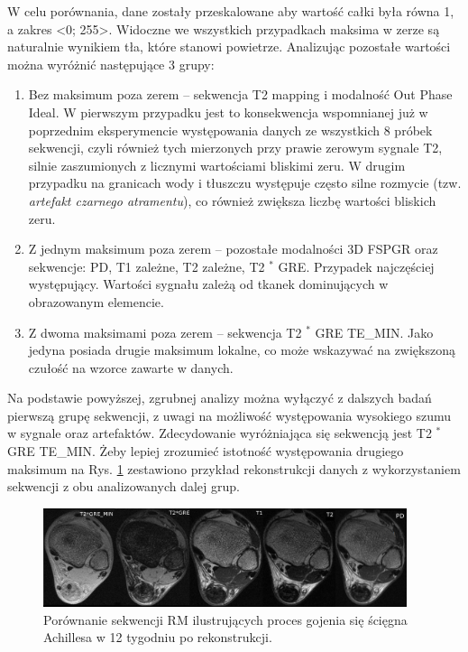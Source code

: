 W celu porównania, dane zostały przeskalowane aby wartość całki była równa 1, a zakres <0; 255>. Widoczne we wszystkich przypadkach maksima w zerze są naturalnie wynikiem tła, które stanowi powietrze. Analizując pozostałe wartości można wyróżnić następujące 3 grupy:

\begin{enumerate}
	\item Bez maksimum poza zerem -- sekwencja T2 mapping i modalność Out Phase Ideal. W pierwszym przypadku jest to konsekwencja wspomnianej już w poprzednim eksperymencie występowania danych ze wszystkich 8 próbek sekwencji, czyli również tych mierzonych przy prawie zerowym sygnale T2, silnie zaszumionych z licznymi wartościami bliskimi zeru. W drugim przypadku na granicach wody i tłuszczu występuje często silne rozmycie (tzw. \textit{artefakt czarnego atramentu}), co również zwiększa liczbę wartości bliskich zeru.
	\item Z jednym maksimum poza zerem -- pozostałe modalności 3D FSPGR oraz sekwencje: PD, T1 zależne, T2 zależne, T2 $^\ast$ GRE. Przypadek najczęściej występujący. Wartości sygnału zależą od tkanek dominujących w obrazowanym elemencie.
	\item Z dwoma maksimami poza zerem -- sekwencja T2 $^\ast$ GRE TE\_MIN. Jako jedyna posiada drugie maksimum lokalne, co może wskazywać na zwiększoną czułość na wzorce zawarte w danych.  
	
\end{enumerate}
Na podstawie powyższej, zgrubnej analizy można wyłączyć z dalszych badań pierwszą grupę sekwencji, z uwagi na możliwość występowania wysokiego szumu w sygnale oraz artefaktów. Zdecydowanie wyróżniająca się sekwencją jest T2 $^\ast$ GRE TE\_MIN. Żeby lepiej zrozumieć istotność występowania drugiego maksimum na Rys. \ref{fig:protocol_comp} zestawiono przykład rekonstrukcji danych z wykorzystaniem sekwencji z obu analizowanych dalej grup. 

 \begin{figure}[h]
 	\centering
 	\includegraphics[width=0.95\textwidth]{figures/Protocol_comparison.png}
 	\caption{Porównanie sekwencji RM ilustrujących proces gojenia się ścięgna Achillesa w 12 tygodniu po rekonstrukcji.}\label{fig:protocol_comp}
 \end{figure}

